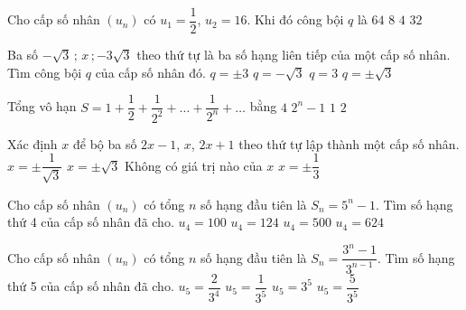 \begin{ex}%
	Cho cấp số nhân $(u_n)$ có $u_1=\dfrac{1}{2}$, $u_2=16$. Khi đó công bội $q$ là
	\choice
	{$64$}
	{$8$}
	{$4$}
	{\True $32$}
\end{ex}
\begin{ex}%
	Ba số $-\sqrt{3}\,;\,x\,;-3\sqrt{3}$ theo thứ tự là ba số hạng liên tiếp của một cấp số nhân. Tìm công bội $q$ của cấp số nhân đó.
	\choice
	{$q=\pm 3$}
	{$q=-\sqrt{3}$}
	{$q=3$}
	{\True \True $q=\pm \sqrt{3}$}
\end{ex}
\begin{ex}%
	Tổng vô hạn $S=1+\dfrac{1}{2}+\dfrac{1}{2^2}+\ldots+\dfrac{1}{2^n}+\ldots$ bằng
	\choice
	{$4$}
	{$2^n-1$}
	{$1$}
	{\True $2$}
	
\end{ex}
\begin{ex}%
	Xác định $x$ để bộ ba số $2x-1$, $x$, $2x+1$ theo thứ tự lập thành một cấp số nhân.
	\choice
	{ \True $x=\pm \dfrac{1}{\sqrt{3}}$}
	{$x=\pm \sqrt{3}$}
	{Không có giá trị nào của $x$}
	{$x=\pm \dfrac{1}{3}$}
\end{ex}
\begin{ex}%
	Cho cấp số nhân $(u_n)$ có tổng $n$ số hạng đầu tiên là $S_n=5^n-1$. Tìm số hạng thứ 4 của cấp số nhân đã cho.
	\choice
	{$u_4=100$}
	{$u_4=124$}
	{\True $u_4=500$}
	{$u_4=624$}
\end{ex}
\begin{ex}%
	Cho cấp số nhân $(u_n)$ có tổng $n$ số hạng đầu tiên là $S_n=\dfrac{3^n-1}{3^{n-1}}$. Tìm số hạng thứ 5 của cấp số nhân đã cho.
	\choice
	{\True $u_5=\dfrac{2}{3^4}$}
	{$u_5=\dfrac{1}{3^5}$}
	{$u_5=3^5$}
	{$u_5=\dfrac{5}{3^5}$}
\end{ex}
